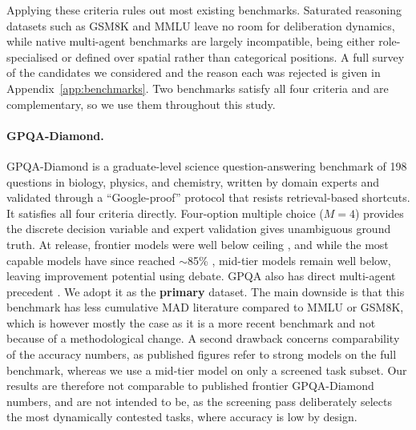 Applying these criteria rules out most existing benchmarks. Saturated reasoning
datasets such as GSM8K and MMLU leave no room for deliberation dynamics, while native
multi-agent benchmarks are largely incompatible, being either role-specialised
or defined over spatial rather than categorical positions. 
A full survey of the candidates we considered and the reason each was
rejected is given in Appendix~\ref{app:benchmarks}. Two benchmarks satisfy all four
criteria and are complementary, so we use them throughout this study.

\paragraph{GPQA-Diamond.}
\label{sec:setup:datasets:gpqa}
GPQA-Diamond \citep{rein2024gpqa} is a graduate-level science
ques\-tion-an\-swer\-ing benchmark of 198 questions in biology, physics, and
chemistry, written by domain experts and validated through a ``Google-proof''
protocol that resists retrieval-based shortcuts. It satisfies all four criteria
directly. Four-option multiple choice ($M = 4$) provides the discrete decision
variable and expert validation gives unambiguous ground truth. At release, frontier
models were well below ceiling \citep{rein2024gpqa}, and while the most capable
models have since reached $\sim$85\% \citep{becker2025orchestration}, mid-tier
models remain well below, leaving improvement potential using debate.
GPQA also has direct multi-agent precedent
\citep{becker2025orchestration, kenton2024debate, wang2025mars}. We
adopt it as the \textbf{primary} dataset. 
The main downside is that this benchmark has less cumulative \ac{MAD} literature compared to MMLU or GSM8K, 
which is however mostly the case as it is a more recent benchmark and not because of a methodological change. 
A second drawback concerns comparability of the accuracy numbers, as published figures
refer to strong models on the full benchmark, whereas we use
a mid-tier model on only a screened task subset.
Our results are therefore not comparable to published frontier GPQA-Diamond
numbers, and are not intended to be, as the screening pass deliberately selects the
most dynamically contested tasks, where accuracy is low by design.

